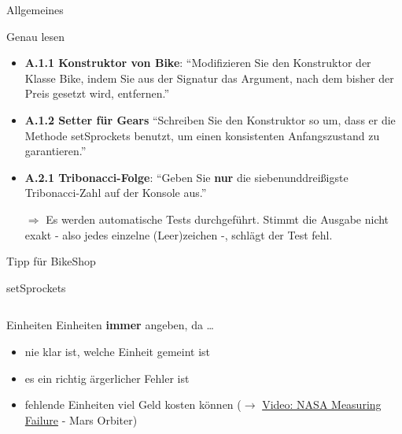 \documentclass[usepdftitle=false,hyperref={pdfpagelabels=false}]{beamer}
\begin{document}
\begin{frame}{Allgemeines}
    \begin{block}{Genau lesen}
      \begin{itemize}[<+->]
        \item \textbf{A.1.1 Konstruktor von Bike}: "`Modifizieren Sie 
              den Konstruktor der Klasse Bike, indem Sie aus der 
              Signatur das Argument, nach dem bisher der Preis 
              gesetzt wird, entfernen."'
        \item \textbf{A.1.2 Setter für Gears} "`Schreiben Sie den 
              Konstruktor so um,  dass er die Methode setSprockets 
              benutzt, um einen  konsistenten Anfangszustand zu 
              garantieren."'
        \item \textbf{A.2.1 Tribonacci-Folge}: "`Geben Sie \textbf{nur} die 
              siebenunddreißigste Tribonacci-Zahl auf der Konsole 
              aus."'
        \item[$\Rightarrow$] Es werden automatische Tests durchgeführt.
              Stimmt die Ausgabe nicht exakt - also jedes einzelne 
              (Leer)zeichen -, schlägt der Test fehl.
      \end{itemize}
    \end{block}
\end{frame}

\begin{frame}{Tipp für BikeShop}
\end{frame}

\begin{frame}{setSprockets}
    \inputminted[linenos=false, numbersep=5pt, tabsize=4, fontsize=\tiny, label=Gears.java, frame=lines, firstline=25, lastline=51]{java}{Gears.java}
\end{frame}

\begin{frame}{Einheiten}
  Einheiten \textbf{immer} angeben, da \dots
  \begin{itemize}[<+->]
    \item nie klar ist, welche Einheit gemeint ist
    \item es ein richtig ärgerlicher Fehler ist
    \item fehlende Einheiten viel Geld kosten können ($\rightarrow$ \href{http://www.youtube.com/watch?v=q2L5\_swAT5A}{Video: NASA Measuring Failure} - Mars Orbiter)
  \end{itemize}
\end{frame}
\end{document}
